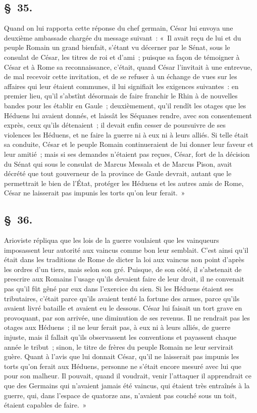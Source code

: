 \documentclass[french,twoside]{book} %
\begin{document}
\subsection[{§ 35.}]{ \textsc{§ 35.} }
\noindent Quand on lui rapporta cette réponse du chef germain, César lui envoya une deuxième ambassade chargée du message suivant : « Il avait reçu de lui et du peuple Romain un grand bienfait, s’étant vu décerner par le Sénat, sous le consulat de César, les titres de roi et d’ami ; puisque sa façon de témoigner à César et à Rome sa reconnaissance, c’était, quand César l’invitait à une entrevue, de mal recevoir cette invitation, et de se refuser à un échange de vues sur les affaires qui leur étaient communes, il lui signifiait les exigences suivantes : en premier lieu, qu’il s’abstînt désormais de faire franchir le Rhin à de nouvelles bandes pour les établir en Gaule ; deuxièmement, qu’il rendît les otages que les Héduens lui avaient donnés, et laissât les Séquanes rendre, avec son consentement exprès, ceux qu’ils détenaient ; il devait enfin cesser de poursuivre de ses violences les Héduens, et ne faire la guerre ni à eux ni à leurs alliés. Si telle était sa conduite, César et le peuple Romain continueraient de lui donner leur faveur et leur amitié ; mais si ses demandes n’étaient pas reçues, César, fort de la décision du Sénat qui sous le consulat de Marcus Messala et de Marcus Pison, avait décrété que tout gouverneur de la province de Gaule devrait, autant que le permettrait le bien de l’État, protéger les Héduens et les autres amis de Rome, César ne laisserait pas impunis les torts qu’on leur ferait. »
\subsection[{§ 36.}]{ \textsc{§ 36.} }
\noindent Arioviste répliqua que les lois de la guerre voulaient que les vainqueurs imposassent leur autorité aux vaincus comme bon leur semblait. C'est ainsi qu’il était dans les traditions de Rome de dicter la loi aux vaincus non point d’après les ordres d’un tiers, mais selon son gré. Puisque, de son côté, il s’abstenait de prescrire aux Romains l’usage qu’ils devaient faire de leur droit, il ne convenait pas qu’il fût gêné par eux dans l’exercice du sien. Si les Héduens étaient ses tributaires, c’était parce qu’ils avaient tenté la fortune des armes, parce qu’ils avaient livré bataille et avaient eu le dessous. César lui faisait un tort grave en provoquant, par son arrivée, une diminution de ses revenus. Il ne rendrait pas les otages aux Héduens ; il ne leur ferait pas, à eux ni à leurs alliés, de guerre injuste, mais il fallait qu’ils observassent les conventions et payassent chaque année le tribut ; sinon, le titre de frères du peuple Romain ne leur servirait guère. Quant à l’avis que lui donnait César, qu’il ne laisserait pas impunis les torts qu’on ferait aux Héduens, personne ne s’était encore mesuré avec lui que pour son malheur. Il pouvait, quand il voudrait, venir l’attaquer il apprendrait ce que des Germains qui n’avaient jamais été vaincus, qui étaient très entraînés à la guerre, qui, dans l’espace de quatorze ans, n’avaient pas couché sous un toit, étaient capables de faire. »
\end{document}
